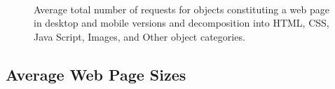 \documentclass[onecolumn,12pt]{IEEEtran}
\begin{document}
\begin{figure}
	\\
\caption{Average total number of requests for objects constituting a web page in desktop and mobile versions and decomposition into  HTML, CSS, Java Script, Images, and Other object categories.\label{fig:requests}}
\end{figure}


\newpage
\subsection{Average Web Page Sizes}
\label{ss:bytes}
\end{document}
